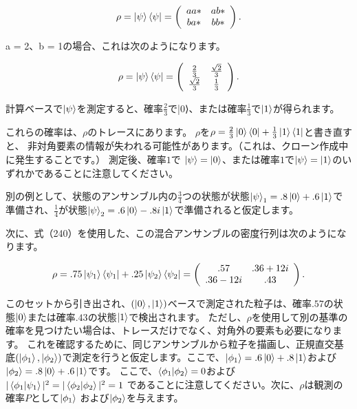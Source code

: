 \begin{equation}
\label{241}
\rho
=
\ket{\psi}\bra{\psi}
=
\left( \begin{array}{cc}
aa* & ab*  \\
ba* & bb*
\end{array} \right).
\end{equation}

a = 2、b = 1の場合、これは次のようになります。

\begin{equation}
\label{242}
\rho
=
\ket{\psi}\bra{\psi}
=
\left( \begin{array}{cc}
\frac{2}{3} & \frac{\sqrt{2}}{3}  \\
\frac{\sqrt{2}}{3} & \frac{1}{3}
\end{array} \right).
\end{equation}

計算ベースで$\ket{\psi}$を測定すると、確率$\frac{2}{3}$で|0⟩、または確率$\frac{1}{3}$で$\ket{1}$が得られます。

これらの確率は、$\rho$のトレースにあります。 $\rho$を$\rho = \frac{2}{3} \ket{0}\bra{0} + \frac{1}{3} \ket{1}\bra{1}$と書き直すと、 非対角要素の情報が失われる可能性があります。（これは、クローン作成中に発生することです。）
測定後、確率$1$で $\ket{\psi} = \ket{0}$、または確率$1$で$\ket{\psi} = \ket{1}$のいずれかであることに注意してください。

別の例として、状態のアンサンブル内の$\frac{3}{4}$つの状態が状態$ \ket{\psi}_1 =.8 \ket{0} + .6 \ket{1} $で準備され、$\frac{1}{4}$が状態$ \ket{\psi}_2 = .6 \ket{0} - .8i \ket{1}$で準備されると仮定します。

次に、式（240）を使用した、この混合アンサンブルの密度行列は次のようになります。

\begin{equation}
\label{243}
\rho
=
.75 \ket{\psi_1}\bra{\psi_1}
+ .25 \ket{\psi_2}\bra{\psi_2}
=
\left( \begin{array}{cc}
.57 & .36+12i  \\
.36-12i & .43
\end{array} \right).
\end{equation}

このセットから引き出され、$( \ket{0}, \ket{1})$ベースで測定された粒子は、確率$.57$の状態$\ket{0}$または確率$.43$の状態$\ket{1}$で検出されます。
ただし、$\rho$を使用して別の基準の確率を見つけたい場合は、トレースだけでなく、対角外の要素も必要になります。
これを確認するために、同じアンサンブルから粒子を描画し、正規直交基底$( \ket{\phi_1}, \ket{\phi_2})$で測定を行うと仮定します。ここで、$\ket{\phi_1} = .6 \ket{0} + .8\ket{1}$および$\ket{\phi_2} = .8 \ket{0} + .6\ket{1}$です。
ここで、$\braket{\phi_1 | \phi_2} = 0 $および $ | \braket{\phi_1 | \psi_1} |^2 =  | \braket{\phi_2 | \phi_2} |^2 = 1 $ であることに注意してください。次に、$\rho$は観測の確率$P$として$\ket{\phi_1}$ および$\ket{\phi_2}$を与えます。

